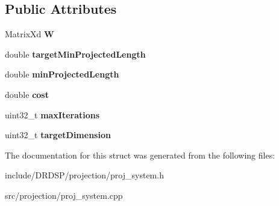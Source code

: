 \subsection*{Public Attributes}
\begin{DoxyCompactItemize}
\item 
\hypertarget{struct_d_r_d_s_p_1_1_proj_secant_system_a3fdf7ca5bba8efbaa050cc39689d2564}{Matrix\-Xd {\bfseries W}}\label{struct_d_r_d_s_p_1_1_proj_secant_system_a3fdf7ca5bba8efbaa050cc39689d2564}

\item 
\hypertarget{struct_d_r_d_s_p_1_1_proj_secant_system_a93c87691b22dc0d95d1c728cfb345d22}{double {\bfseries target\-Min\-Projected\-Length}}\label{struct_d_r_d_s_p_1_1_proj_secant_system_a93c87691b22dc0d95d1c728cfb345d22}

\item 
\hypertarget{struct_d_r_d_s_p_1_1_proj_secant_system_abb68167de37e504f0f5db1c8b98d32bf}{double {\bfseries min\-Projected\-Length}}\label{struct_d_r_d_s_p_1_1_proj_secant_system_abb68167de37e504f0f5db1c8b98d32bf}

\item 
\hypertarget{struct_d_r_d_s_p_1_1_proj_secant_system_a7040f9fdb379fc79273a7a74f08d6c75}{double {\bfseries cost}}\label{struct_d_r_d_s_p_1_1_proj_secant_system_a7040f9fdb379fc79273a7a74f08d6c75}

\item 
\hypertarget{struct_d_r_d_s_p_1_1_proj_secant_system_aa368a44944ac9666ca0586213147cf52}{uint32\-\_\-t {\bfseries max\-Iterations}}\label{struct_d_r_d_s_p_1_1_proj_secant_system_aa368a44944ac9666ca0586213147cf52}

\item 
\hypertarget{struct_d_r_d_s_p_1_1_proj_secant_system_aacf857ec290a0ab9cfcf008fd97aeb07}{uint32\-\_\-t {\bfseries target\-Dimension}}\label{struct_d_r_d_s_p_1_1_proj_secant_system_aacf857ec290a0ab9cfcf008fd97aeb07}

\end{DoxyCompactItemize}


The documentation for this struct was generated from the following files\-:\begin{DoxyCompactItemize}
\item 
include/\-D\-R\-D\-S\-P/projection/proj\-\_\-system.\-h\item 
src/projection/proj\-\_\-system.\-cpp\end{DoxyCompactItemize}
